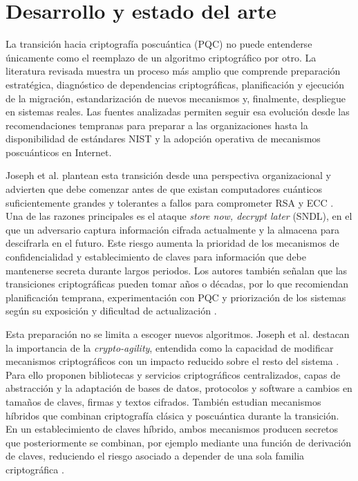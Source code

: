 \section{Desarrollo y estado del arte}
\label{sec:estado-arte}

La transición hacia criptografía poscuántica (PQC) no puede entenderse únicamente como el reemplazo de un algoritmo criptográfico por otro. La literatura revisada muestra un proceso más amplio que comprende preparación estratégica, diagnóstico de dependencias criptográficas, planificación y ejecución de la migración, estandarización de nuevos mecanismos y, finalmente, despliegue en sistemas reales. Las fuentes analizadas permiten seguir esa evolución desde las recomendaciones tempranas para preparar a las organizaciones hasta la disponibilidad de estándares NIST y la adopción operativa de mecanismos poscuánticos en Internet.

Joseph et al. plantean esta transición desde una perspectiva organizacional y advierten que debe comenzar antes de que existan computadores cuánticos suficientemente grandes y tolerantes a fallos para comprometer RSA y ECC \cite{joseph2022transitioning}. Una de las razones principales es el ataque \textit{store now, decrypt later} (SNDL), en el que un adversario captura información cifrada actualmente y la almacena para descifrarla en el futuro. Este riesgo aumenta la prioridad de los mecanismos de confidencialidad y establecimiento de claves para información que debe mantenerse secreta durante largos periodos. Los autores también señalan que las transiciones criptográficas pueden tomar años o décadas, por lo que recomiendan planificación temprana, experimentación con PQC y priorización de los sistemas según su exposición y dificultad de actualización \cite{joseph2022transitioning}.

Esta preparación no se limita a escoger nuevos algoritmos. Joseph et al. destacan la importancia de la \textit{crypto-agility}, entendida como la capacidad de modificar mecanismos criptográficos con un impacto reducido sobre el resto del sistema \cite{joseph2022transitioning}. Para ello proponen bibliotecas y servicios criptográficos centralizados, capas de abstracción y la adaptación de bases de datos, protocolos y software a cambios en tamaños de claves, firmas y textos cifrados. También estudian mecanismos híbridos que combinan criptografía clásica y poscuántica durante la transición. En un establecimiento de claves híbrido, ambos mecanismos producen secretos que posteriormente se combinan, por ejemplo mediante una función de derivación de claves, reduciendo el riesgo asociado a depender de una sola familia criptográfica \cite{joseph2022transitioning}.

